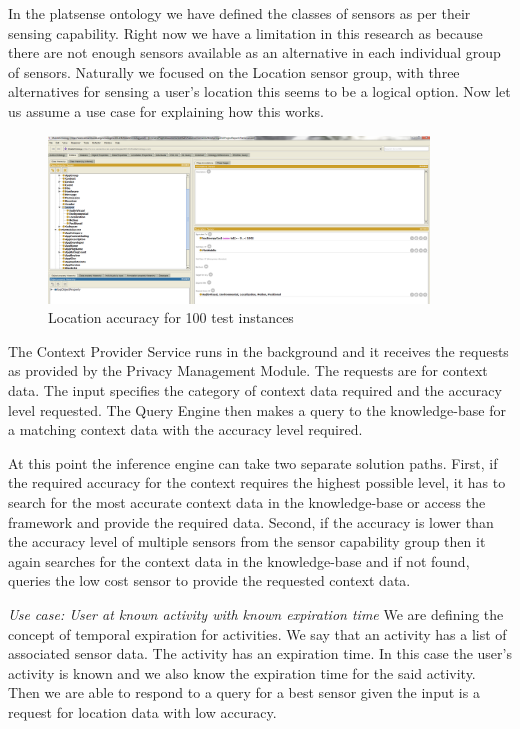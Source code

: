 \documentclass{ubicomp2013}
\begin{document}
In the platsense ontology we have defined the classes of sensors as per their sensing capability. Right now we have a limitation in this research as because there are not enough sensors available as an alternative in each individual group of sensors. Naturally we focused on the Location sensor group, with three alternatives for sensing a user's location this seems to be a logical option. Now let us assume a use case for explaining how this works. 

\begin{figure}[tbh]
\centering
\includegraphics[width=0.9\textwidth]{ontology.png}
\caption{Location accuracy for 100 test instances}
\label{fig:ontology}
\end{figure}

The Context Provider Service runs in the background and it receives the requests as provided by the Privacy Management Module. The requests are for context data. The input specifies the category of context data required and the accuracy level requested. The Query Engine then makes a query to the knowledge-base for a matching context data with the accuracy level required.

At this point the inference engine can take two separate solution paths. First, if the required accuracy for the context requires the highest possible level, it has to search for the most accurate context data in the knowledge-base or access the framework and provide the required data. Second, if the accuracy is lower than the accuracy level of multiple sensors from the sensor capability group then it again searches for the context data in the knowledge-base and if not found, queries the low cost sensor to provide the requested context data.

{\em Use case: User at known activity with known expiration time}
We are defining the concept of temporal expiration for activities. We say that an activity has a list of associated sensor data. The activity has an expiration time. In this case the user's activity is known and we also know the expiration time for the said activity. Then we are able to respond to a query for a best sensor given the input is a request for location data with low accuracy.
\end{document}
